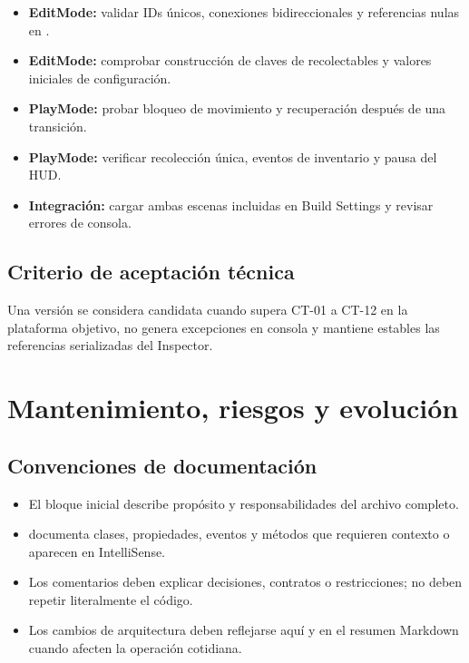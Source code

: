 \documentclass[11pt,a4paper,oneside]{report}
\newcommand{\code}[1]{\texttt{\detokenize{#1}}}
\begin{document}
\begin{itemize}
  \item \textbf{EditMode:} validar IDs únicos, conexiones bidireccionales y referencias nulas en \code{RoomNode}.
  \item \textbf{EditMode:} comprobar construcción de claves de recolectables y valores iniciales de configuración.
  \item \textbf{PlayMode:} probar bloqueo de movimiento y recuperación después de una transición.
  \item \textbf{PlayMode:} verificar recolección única, eventos de inventario y pausa del HUD.
  \item \textbf{Integración:} cargar ambas escenas incluidas en Build Settings y revisar errores de consola.
\end{itemize}

\section{Criterio de aceptación técnica}

Una versión se considera candidata cuando supera CT-01 a CT-12 en la plataforma objetivo, no genera excepciones en consola y mantiene estables las referencias serializadas del Inspector.

\chapter{Mantenimiento, riesgos y evolución}

\section{Convenciones de documentación}

\begin{itemize}
  \item El bloque inicial \code{/** ... */} describe propósito y responsabilidades del archivo completo.
  \item \code{/// <summary>} documenta clases, propiedades, eventos y métodos que requieren contexto o aparecen en IntelliSense.
  \item Los comentarios deben explicar decisiones, contratos o restricciones; no deben repetir literalmente el código.
  \item Los cambios de arquitectura deben reflejarse aquí y en el resumen Markdown cuando afecten la operación cotidiana.
\end{itemize}
\end{document}
